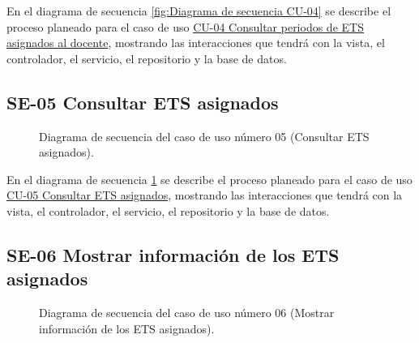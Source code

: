 En el diagrama de secuencia \ref{fig:Diagrama de secuencia CU-04} se describe el proceso planeado para el caso de uso \hyperlink{CU-04}{CU-04 Consultar periodos de ETS asignados al docente}, mostrando las interacciones que tendrá con la vista, el controlador, el servicio, el repositorio y la base de datos.

\newpage

\subsection{SE-05 Consultar ETS asignados}

\begin{figure}[htbp!]
	\begin{center}
		\caption{Diagrama de secuencia del caso de uso número 05 (Consultar ETS asignados).}
		\label{fig:Diagrama de secuencia CU-05}
	\end{center}
\end{figure}

En el diagrama de secuencia \ref{fig:Diagrama de secuencia CU-05} se describe el proceso planeado para el caso de uso \hyperlink{CU-05}{CU-05 Consultar ETS asignados}, mostrando las interacciones que tendrá con la vista, el controlador, el servicio, el repositorio y la base de datos.

\newpage

\subsection{SE-06 Mostrar información de los ETS asignados}

\begin{figure}[htbp!]
	\begin{center}
		\caption{Diagrama de secuencia del caso de uso número 06 (Mostrar información de los ETS asignados).}
		\label{fig:Diagrama de secuencia CU-06}
	\end{center}
\end{figure}


